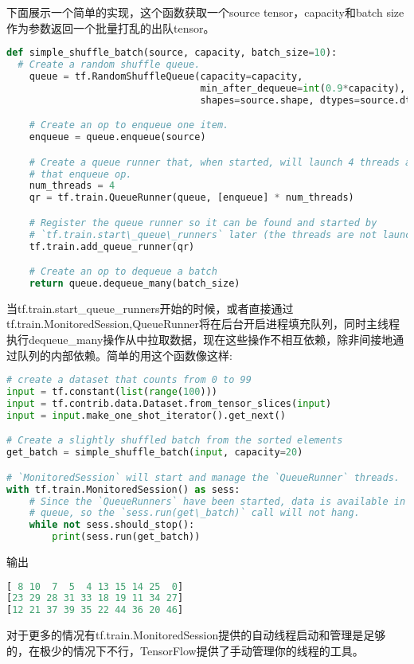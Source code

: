 下面展示一个简单的实现，这个函数获取一个source tensor，capacity和batch size作为参数返回一个批量打乱的出队tensor。
\begin{lstlisting}[language=Python]
def simple_shuffle_batch(source, capacity, batch_size=10):
  # Create a random shuffle queue.
    queue = tf.RandomShuffleQueue(capacity=capacity,
                                  min_after_dequeue=int(0.9*capacity),
                                  shapes=source.shape, dtypes=source.dtype)

    # Create an op to enqueue one item.
    enqueue = queue.enqueue(source)

    # Create a queue runner that, when started, will launch 4 threads applying
    # that enqueue op.
    num_threads = 4
    qr = tf.train.QueueRunner(queue, [enqueue] * num_threads)

    # Register the queue runner so it can be found and started by
    # `tf.train.start\_queue\_runners` later (the threads are not launched yet).
    tf.train.add_queue_runner(qr)

    # Create an op to dequeue a batch
    return queue.dequeue_many(batch_size)
\end{lstlisting}
当tf.train.start\_queue\_runners开始的时候，或者直接通过tf.train.MonitoredSession,QueueRunner将在后台开启进程填充队列，同时主线程执行dequeue\_many操作从中拉取数据，现在这些操作不相互依赖，除非间接地通过队列的内部依赖。简单的用这个函数像这样:
\begin{lstlisting}[language=Python]
# create a dataset that counts from 0 to 99
input = tf.constant(list(range(100)))
input = tf.contrib.data.Dataset.from_tensor_slices(input)
input = input.make_one_shot_iterator().get_next()

# Create a slightly shuffled batch from the sorted elements
get_batch = simple_shuffle_batch(input, capacity=20)

# `MonitoredSession` will start and manage the `QueueRunner` threads.
with tf.train.MonitoredSession() as sess:
    # Since the `QueueRunners` have been started, data is available in the
    # queue, so the `sess.run(get\_batch)` call will not hang.
    while not sess.should_stop():
        print(sess.run(get_batch))
\end{lstlisting}
输出
\begin{lstlisting}[language=Python]
[ 8 10  7  5  4 13 15 14 25  0]
[23 29 28 31 33 18 19 11 34 27]
[12 21 37 39 35 22 44 36 20 46]
\end{lstlisting}
对于更多的情况有tf.train.MonitoredSession提供的自动线程启动和管理是足够的，在极少的情况下不行，TensorFlow提供了手动管理你的线程的工具。
